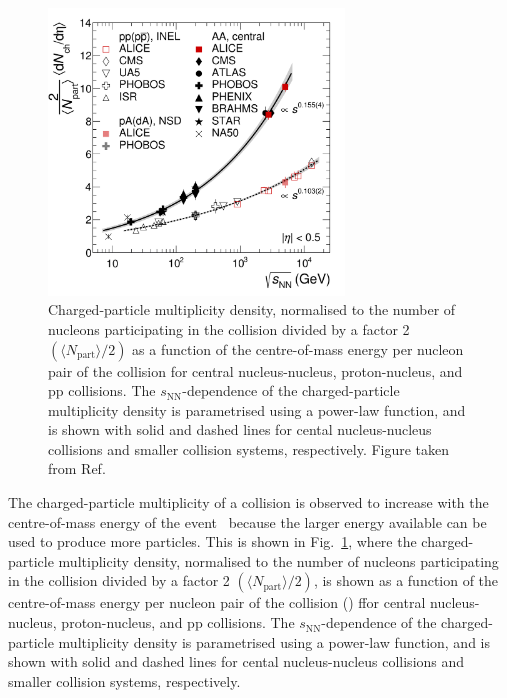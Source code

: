 \begin{figure}[tb]
    \centering
    \includegraphics[width=0.7\textwidth]{Figures/Chapter 7/sqrtsFig-18534.png}
    \caption{Charged-particle multiplicity density, normalised to the number of nucleons participating in the collision divided by a factor 2 $\left(\langle N_\mathrm{part}\rangle/2\right)$ as a function of the centre-of-mass energy per nucleon pair of the collision for central nucleus-nucleus, proton-nucleus, and pp collisions. The $s_\mathrm{NN}$-dependence of the charged-particle multiplicity density is parametrised using a power-law function, and is shown with solid and dashed lines for cental nucleus-nucleus collisions and smaller collision systems, respectively. Figure taken from Ref.~\cite{ALICE:2015juo}}  
    \label{fig:pseudorap_density}
\end{figure}

The charged-particle multiplicity of a collision is observed to increase with the centre-of-mass energy of the event~\cite{ALICE:2015juo,ALICE:2020swj} because the larger energy available can be used to produce more particles. This is shown in Fig.~\ref{fig:pseudorap_density}, where the charged-particle multiplicity density, normalised to the number of nucleons participating in the collision divided by a factor 2 $\left(\langle N_\mathrm{part}\rangle/2\right)$, is shown as a function of the centre-of-mass energy per nucleon pair of the collision (\snn) ffor central nucleus-nucleus, proton-nucleus, and pp collisions. The $s_\mathrm{NN}$-dependence of the charged-particle multiplicity density is parametrised using a power-law function, and is shown with solid and dashed lines for cental nucleus-nucleus collisions and smaller collision systems, respectively.

